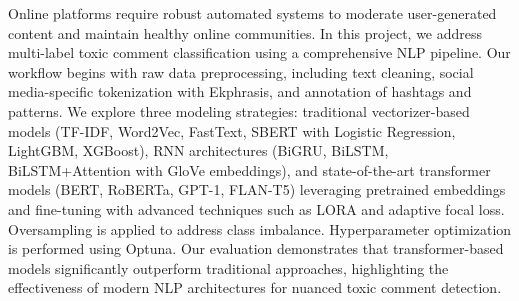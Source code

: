 

    {
        Online platforms require robust automated systems to moderate user-generated content and maintain healthy online communities. In this project, we address multi-label toxic comment classification using a comprehensive NLP pipeline. Our workflow begins with raw data preprocessing, including text cleaning, social media-specific tokenization with Ekphrasis, and annotation of hashtags and patterns. We explore three modeling strategies: traditional vectorizer-based models (TF-IDF, Word2Vec, FastText, SBERT with Logistic Regression, LightGBM, XGBoost), RNN architectures (BiGRU, BiLSTM, BiLSTM+Attention with GloVe embeddings), and state-of-the-art transformer models (BERT, RoBERTa, GPT-1, FLAN-T5) leveraging pretrained embeddings and fine-tuning with advanced techniques such as LORA and adaptive focal loss. Oversampling is applied to address class imbalance. Hyperparameter optimization is performed using Optuna. Our evaluation demonstrates that transformer-based models significantly outperform traditional approaches, highlighting the effectiveness of modern NLP architectures for nuanced toxic comment detection.
    }

